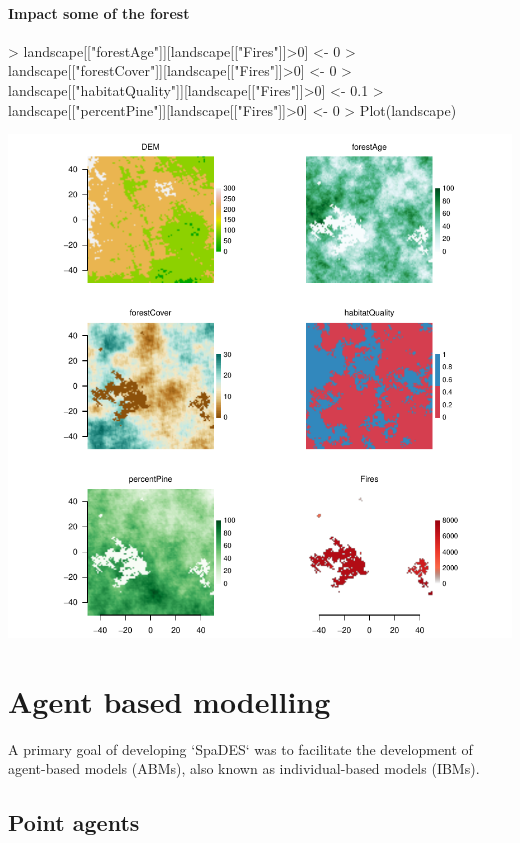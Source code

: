 \documentclass{article}
\begin{document}
\paragraph{Impact some of the forest}
\begin{Schunk}
\begin{Sinput}
> landscape[["forestAge"]][landscape[["Fires"]]>0] <- 0
> landscape[["forestCover"]][landscape[["Fires"]]>0] <- 0
> landscape[["habitatQuality"]][landscape[["Fires"]]>0] <- 0.1
> landscape[["percentPine"]][landscape[["Fires"]]>0] <- 0
> Plot(landscape)
\end{Sinput}
\end{Schunk}
\includegraphics{introduction-fire-impacts-maps}

\newpage

\section{Agent based modelling}
A primary goal of developing `SpaDES` was to facilitate the development of agent-based models (ABMs), also known as individual-based models (IBMs).

\subsection{Point agents}
\end{document}
